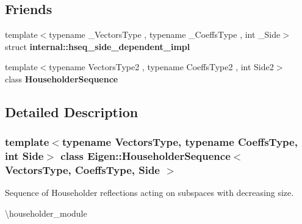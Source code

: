 \subsection*{Friends}
\begin{DoxyCompactItemize}
\item 
\mbox{\label{class_eigen_1_1_householder_sequence_ad2b8c53f81cf9ea056a2eec6ad36cb6b}} 
{\footnotesize template$<$typename \+\_\+\+Vectors\+Type , typename \+\_\+\+Coeffs\+Type , int \+\_\+\+Side$>$ }\\struct {\bfseries internal\+::hseq\+\_\+side\+\_\+dependent\+\_\+impl}
\item 
\mbox{\label{class_eigen_1_1_householder_sequence_a0391b4d06b329c6769a841677572ac6b}} 
{\footnotesize template$<$typename Vectors\+Type2 , typename Coeffs\+Type2 , int Side2$>$ }\\class {\bfseries Householder\+Sequence}
\end{DoxyCompactItemize}


\subsection{Detailed Description}
\subsubsection*{template$<$typename Vectors\+Type, typename Coeffs\+Type, int Side$>$\newline
class Eigen\+::\+Householder\+Sequence$<$ Vectors\+Type, Coeffs\+Type, Side $>$}

Sequence of Householder reflections acting on subspaces with decreasing size. 

\textbackslash{}householder\+\_\+module


